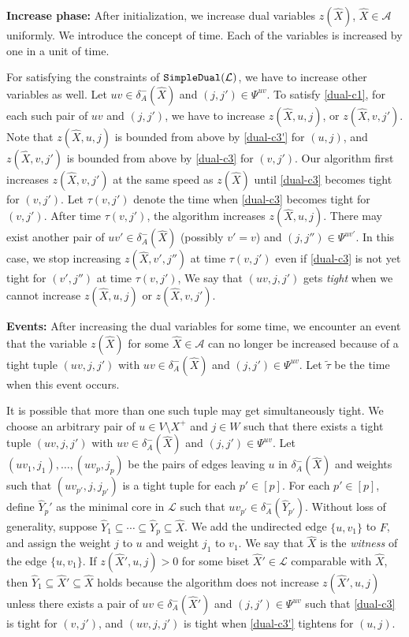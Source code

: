 \documentclass[11pt]{article}
\newcommand{\Afam}{\mathcal{A}}
\newcommand{\Lfam}{\mathcal{L}}
\newcommand{\CoreDual}{{\tt SimpleDual}}
\begin{document}
{\bf Increase phase:}
After initialization, we increase dual variables
$z(\hat{X})$, $\hat{X}\in \Afam$ uniformly.
We introduce the concept of time. Each of the variables is
increased by one in a unit of time. 

For satisfying the constraints of $\CoreDual(\Lfam)$,
we have to increase other variables as well.
Let $uv \in \delta^-_A(\hat{X})$ and $(j,j') \in \Psi^{uv}$.
To satisfy \eqref{dual-c1},
for each such pair of $uv$ and $(j,j')$, 
we have to increase 
$z(\hat{X},u,j)$,
or $z(\hat{X},v,j')$.
Note that $z(\hat{X},u,j)$ 
is bounded from above by \eqref{dual-c3'} for $(u,j)$,
and $z(\hat{X},v,j')$ is bounded from above 
by \eqref{dual-c3} for $(v, j')$.
Our algorithm first increases $z(\hat{X},v,j')$ at the same speed
as $z(\hat{X})$ until 
\eqref{dual-c3} becomes tight for $(v,j')$.
Let $\tau(v,j')$ denote the time when 
\eqref{dual-c3} becomes tight for $(v,j')$.
After time $\tau(v,j')$,
the algorithm increases $z(\hat{X},u,j)$.
There may exist another pair of $uv' \in \delta^-_A(\hat{X})$ (possibly
$v'=v$) and $(j,j'') \in \Psi^{uv'}$.
In this case,
we stop increasing $z(\hat{X},v',j'')$ 
at time $\tau(v,j')$
even if \eqref{dual-c3} is not yet
tight for $(v',j'')$ at time $\tau(v,j')$,
We say that $(uv,j,j')$ gets {\em tight}
when we cannot increase 
$z(\hat{X},u,j)$ 
or $z(\hat{X},v,j')$.



{\bf Events:}
After increasing the dual variables for some time, 
we encounter an event that the variable $z(\hat{X})$ for some $\hat{X} \in
\Afam$ can no longer be increased
because of a tight tuple $(uv,j,j')$ with $uv \in \delta_A^-(\hat{X})$ and $(j,j')
\in \Psi^{uv}$.
Let $\tilde{\tau}$ be the time when this event occurs.

It is possible that 
more than one such tuple may get simultaneously tight.
We choose an arbitrary pair of $u \in V \setminus X^+$ and $j \in W$
such that there exists a tight tuple $(uv,j,j')$ with $uv \in \delta^-_A(\hat{X})$
and $(j,j') \in \Psi^{uv}$.
Let $(uv_{1},j_1),\ldots,(uv_{p},j_p)$ be the pairs of edges leaving $u$ in
$\delta^-_A(\hat{X})$ and weights such that 
$(uv_{p'},j,j_{p'})$ is a tight tuple for each $p' \in [p]$.
For each $p' \in [p]$, define
$\hat{Y}_p'$ as the 
minimal core in $\Lfam$ such that $uv_{p'} \in \delta^-_A(\hat{Y}_{p'})$.
Without loss of generality, 
suppose $\hat{Y}_1 \subseteq \cdots \subseteq \hat{Y}_p \subseteq \hat{X}$.
We add the
undirected edge $\{u,v_{1}\}$ to $F$, and assign the weight $j$ to $u$
and weight $j_1$ to $v_1$.
We say that $\hat{X}$ is the {\em witness} of the edge $\{u,v_{1}\}$.
If $z(\hat{X}',u,j)>0$ for some biset $\hat{X}' \in \Lfam$ comparable with
$\hat{X}$, then 
$\hat{Y}_1 \subseteq \hat{X}' \subseteq \hat{X}$ holds
because
the algorithm does not increase
$z(\hat{X}',u,j)$
unless there exists a pair of $uv\in \delta^-_A(\hat{X}')$
and $(j,j')\in \Psi^{uv}$
such that 
\eqref{dual-c3} is tight for $(v,j')$, and $(uv,j,j')$ is tight when
\eqref{dual-c3'} tightens for $(u,j)$.
\end{document}
